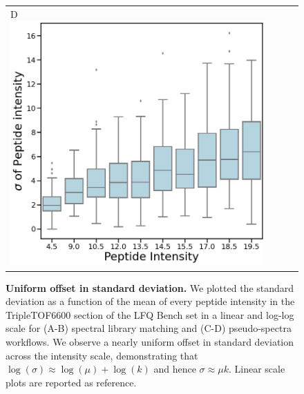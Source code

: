 \documentclass[11pt]{article}
\begin{document}
\begin{figure}[hbt]
\begin{tabular}{lclc}
        D \includegraphics[width=0.5\linewidth]{../../result/mu_sigma_variance_plots/diann/diann_boxplot_nolog_qvalFiltered_pepFiltered_qbinned.png} & \\%
    \end{tabular}
  \caption{{\bf Uniform offset in standard deviation.} We plotted the standard deviation as a function of the mean of every peptide intensity in the TripleTOF6600 section of the LFQ Bench set  in a linear and log-log scale for (A-B) spectral library matching and (C-D) pseudo-spectra workflows.  We observe a nearly uniform offset in standard deviation across the intensity scale, demonstrating that $\log(\sigma) \approx \log(\mu) + \log(k)$ and hence   $\sigma \approx \mu k$. Linear scale plots are reported as reference.  \label{fig:uniform_offset_in_standard_deviation_boxplot}}
\end{figure}
\end{document}
